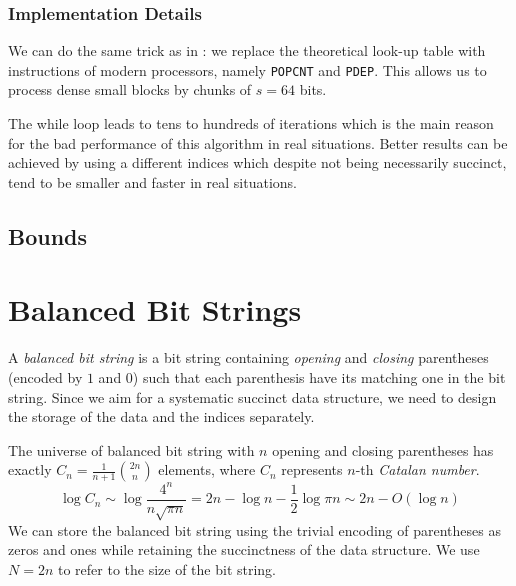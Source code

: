 \subsubsection{Implementation Details}

We can do the same trick as in \rank{}: we replace the theoretical look-up table with instructions of modern processors, namely \verb|POPCNT| and \verb|PDEP|.
This allows us to process dense small blocks by chunks of $s = 64$ bits.

The while loop leads to tens to hundreds of iterations which is the main reason for the bad performance of this algorithm in real situations.
Better results can be achieved by using a different indices which despite not being necessarily succinct, tend to be smaller and faster in real situations.

\subsection{Bounds}


\section{Balanced Bit Strings}

A \emph{balanced bit string} is a bit string containing \emph{opening} and \emph{closing} parentheses (encoded by $1$ and $0$) such that each parenthesis have its matching one in the bit string.
Since we aim for a systematic succinct data structure, we need to design the storage of the data and the indices separately.

The universe of balanced bit string with $n$ opening and closing parentheses has exactly $C_n = \frac{1}{n+1} {2n \choose n}$ elements, where $C_n$ represents $n$-th \emph{Catalan number}.
$$ \log C_n \sim \log \frac{4^n}{n \sqrt{\pi n}} = 2n - \log n - \frac{1}{2} \log{\pi n} \sim 2n - O(\log n) $$
We can store the balanced bit string using the trivial encoding of parentheses as zeros and ones while retaining the succinctness of the data structure.
We use $N = 2n$ to refer to the size of the bit string.

